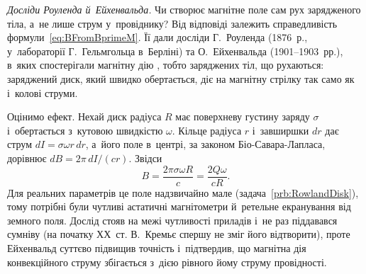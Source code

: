 \begin{Historical}\label{hist:RowlandEichenwald}
	\emph{Досліди Роуленда й~Ейхенвальда.} Чи створює магнітне поле сам рух зарядженого
	тіла, а~не лише струм у~провіднику? Від відповіді залежить справедливість
	формули~\eqref{eq:BFromBprimeM}. Її дали досліди Г.~Роуленда (1876~р., у~лабораторії
	Г.~Гельмгольца в~Берліні) та О.~Ейхенвальда (1901--1903~рр.), в~яких спостерігали
	магнітну дію , тобто заряджених тіл, що рухаються:
	заряджений диск, який швидко обертається, діє на магнітну стрілку так само як і~колові
	струми.

	Оцінимо ефект. Нехай диск радіуса $R$ має поверхневу густину заряду $\sigma$
	і~обертається з~кутовою швидкістю $\omega$. Кільце радіуса $r$ і~завширшки $dr$ дає
	струм $dI = \sigma\omega r\, dr$, а~його поле в~центрі, за законом Біо-Савара-Лапласа,
	дорівнює $dB = 2\pi\, dI/(cr)$. Звідси
	\begin{equation*}
		B = \frac{2\pi\sigma\omega R}{c} = \frac{2Q\omega}{cR}.
	\end{equation*}
	Для реальних параметрів це поле надзвичайно мале (задача~\ref{prb:RowlandDisk}), тому
	потрібні були чутливі астатичні магнітометри й~ретельне екранування від земного поля.
	Дослід стояв на межі чутливості приладів і~не раз піддавався сумніву (на початку
	ХХ~ст. В.~Кремьє спершу не зміг його відтворити), проте Ейхенвальд суттєво підвищив
	точність і~підтвердив, що магнітна дія конвекційного струму збігається з~дією рівного
	йому струму провідності.

\end{Historical}

